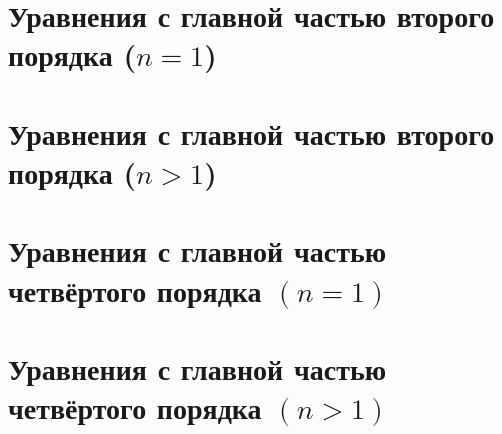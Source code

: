 \documentclass{report}
\begin{document}
    \chapter{Уравнения с главной частью второго порядка ($n=1$)}

    \chapter{Уравнения с главной частью второго порядка ($n>1$)}

    \chapter{Уравнения с главной частью четвёртого порядка $(n=1)$}

    \chapter{Уравнения с главной частью четвёртого порядка $(n>1)$}
\end{document}
